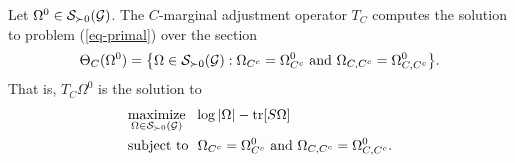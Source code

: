 \begin{lemma} \label{lem-tc-sol-opt}
    Let $\Omega^0 \in {\mathcal{S}}_{\succ 0}({\mathcal{G}})$. The $C$-marginal adjustment operator $T_C$ computes the solution to problem (\ref{eq-primal}) over the section 
    \begin{equation*}
        \Theta_C(\Omega^0) = {\left\{ \Omega \in {\mathcal{S}}_{\succ 0}({\mathcal{G}}) : \Omega_{C^c} = \Omega^0_{C^c} {\textrm{ and }} \Omega_{C, C^c} = \Omega^0_{C, C^c} \right\}}.
    \end{equation*}
    That is, $T_C \Omega^0$ is the solution to
    \begin{align} \label{eq-sub-optim}
        \begin{split}
            &\underset{\Omega \in \S_{\succ 0}(\G)}{\t{maximize}}\ \  \log |\Omega| - \tr[S\Omega]\\
            &\t{subject to}\ \ \Omega_{C^c} = \Omega^0_{C^c} \t{ and } \Omega_{C, C^c} = \Omega^0_{C, C^c}.
        \end{split}
    \end{align}
\end{lemma}
